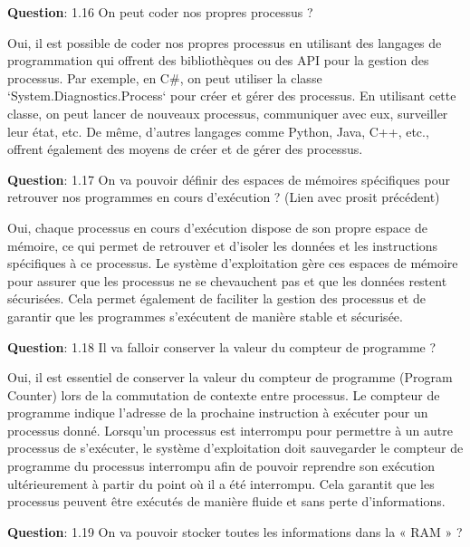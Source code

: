 \noindent \textbf{Question}: 1.16 On peut coder nos propres processus ?

\noindent Oui, il est possible de coder nos propres processus en utilisant des langages de programmation qui offrent des bibliothèques ou des API pour la gestion des processus. Par exemple, en C\#, on peut utiliser la classe `System.Diagnostics.Process` pour créer et gérer des processus. En utilisant cette classe, on peut lancer de nouveaux processus, communiquer avec eux, surveiller leur état, etc. De même, d'autres langages comme Python, Java, C++, etc., offrent également des moyens de créer et de gérer des processus.

\vspace{0.5cm}

\noindent \textbf{Question}: 1.17 On va pouvoir définir des espaces de mémoires spécifiques pour retrouver nos programmes en cours d'exécution ? (Lien avec prosit précédent)

\noindent Oui, chaque processus en cours d'exécution dispose de son propre espace de mémoire, ce qui permet de retrouver et d'isoler les données et les instructions spécifiques à ce processus. Le système d'exploitation gère ces espaces de mémoire pour assurer que les processus ne se chevauchent pas et que les données restent sécurisées. Cela permet également de faciliter la gestion des processus et de garantir que les programmes s'exécutent de manière stable et sécurisée.

\vspace{0.5cm}

\noindent \textbf{Question}: 1.18 Il va falloir conserver la valeur du compteur de programme ?

\noindent Oui, il est essentiel de conserver la valeur du compteur de programme (Program Counter) lors de la commutation de contexte entre processus. Le compteur de programme indique l'adresse de la prochaine instruction à exécuter pour un processus donné. Lorsqu'un processus est interrompu pour permettre à un autre processus de s'exécuter, le système d'exploitation doit sauvegarder le compteur de programme du processus interrompu afin de pouvoir reprendre son exécution ultérieurement à partir du point où il a été interrompu. Cela garantit que les processus peuvent être exécutés de manière fluide et sans perte d'informations.

\vspace{0.5cm}

\noindent \textbf{Question}: 1.19 On va pouvoir stocker toutes les informations dans la « RAM » ?

